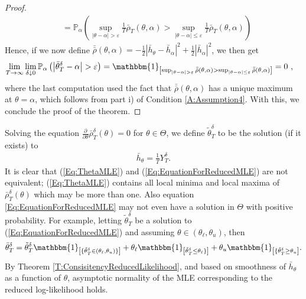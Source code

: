 \documentclass{article}
\newcommand{\indicator}[1]{\mathbbm{1}_{\left[ {#1} \right] }}
\begin{document}
\begin{proof}
\begin{align}
&=
\mathbb{P}_{\alpha}\left(\sup_{\left|\theta-\alpha\right|>\varepsilon}\frac{1}{T}\bar{\rho}_{T}(\theta,\alpha)>\sup_{\left|\theta-\alpha\right|\leq\varepsilon}\frac{1}{T}\bar{\rho}_{T}(\theta,\alpha)\right)\nonumber
\end{align}
Hence, if we now define $\bar{\bar{\rho}}(\theta,\alpha)=-\frac{1}{2}|\bar h_{\theta} -\bar h_{\alpha}|^{2}+\frac{1}{2}|\bar h_{\alpha}|^2$, we then get
\begin{align}
\lim_{T\rightarrow\infty}\lim_{\delta\downarrow 0}\mathbb{P}_{\alpha}\left(\left|\bar{\theta}^{\delta}_{T}-\alpha\right|>\varepsilon\right)&=
\indicator{\sup_{\left|\theta-\alpha\right|>\varepsilon}\bar{\bar{\rho}}(\theta,\alpha)>\sup_{\left|\theta-\alpha\right|\leq\varepsilon}\bar{\bar{\rho}}(\theta,\alpha)}=0\ ,\nonumber
\end{align}
where the last computation used the fact that $\bar{\bar{\rho}}(\theta,\alpha)$ has a unique maximum at $\theta=\alpha$, which follows from part i) of Condition \ref{A:Assumption4}. With this, we conclude the proof of the theorem.
\end{proof}

Solving the equation $\frac{\partial}{\partial \theta}\bar{\rho}^{\delta}_{T}( \theta)=0$ for $\theta\in\Theta$, we define $\tilde{\theta}^{\delta}_{T}$ to be the solution (if it exists) to
\begin{align}
 \bar{h}_{\theta}=\frac 1TY^{\delta}_{T}.\label{Eq:EquationForReducedMLE}
\end{align}
It is clear that (\ref{Eq:ThetaMLE}) and (\ref{Eq:EquationForReducedMLE}) are not equivalent; (\ref{Eq:ThetaMLE}) contains all local minima and local maxima of $\bar{\rho}^{\delta}_{T}(\theta)$ which may be more than one. Also equation \eqref{Eq:EquationForReducedMLE} may not even have a solution in $\Theta$ with positive probability. For example, letting $\tilde{\theta}^{\delta}_{T}$ be a solution to (\ref{Eq:EquationForReducedMLE}) and assuming $\theta\in(\theta_\ell,\theta_u)$, then
\[
\bar{\theta}^{\delta}_{T}=\tilde{\theta}^{\delta}_{T}\indicator{\{\tilde{\theta}^{\delta}_{T}\in(\theta_{\ell},\theta_{u})\}}+\theta_{\ell}\indicator{\tilde{\theta}^{\delta}_{T}\leq \theta_{\ell}\}}+\theta_{u}\indicator{\{\tilde{\theta}^{\delta}_{T}\geq \theta_{u}}.
\]
By Theorem \ref{T:ConsisitencyReducedLikelihood}, and based on smoothness of $\bar{h}_{\theta}$ as a function of $\theta$, asymptotic normality of the MLE corresponding to the reduced log-likelihood holds.
\end{document}
